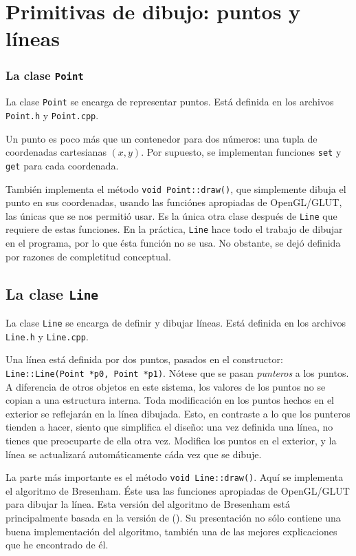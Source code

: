 \section{Primitivas de dibujo: puntos y líneas}
\label{primitivas_dibujo}

\subsubsection{La clase \lstinline!Point!}

La clase \lstinline!Point! se encarga de representar puntos. Está definida en
los archivos \lstinline!Point.h! y \lstinline!Point.cpp!.

Un punto es poco más que un contenedor para dos números: una tupla de coordenadas
cartesianas $(x, y)$. Por supuesto, se implementan funciones \lstinline!set! y
\lstinline!get! para cada coordenada.

También implementa el método \lstinline!void Point::draw()!, que simplemente dibuja
el punto en sus coordenadas, usando las funciónes apropiadas de OpenGL/GLUT, las
únicas que se nos permitió usar. Es la única
otra clase después de \lstinline!Line! que requiere de estas funciones. En la práctica,
\lstinline!Line! hace todo el trabajo de dibujar en el programa, por lo que ésta
función no se usa. No obstante, se dejó definida por razones de completitud conceptual.

\subsection{La clase \lstinline!Line!}

La clase \lstinline!Line! se encarga de definir y dibujar líneas. Está definida en
los archivos \lstinline!Line.h! y \lstinline!Line.cpp!.

Una línea está definida por dos puntos, pasados en el constructor: \lstinline!Line::Line(Point *p0, Point *p1)!.
Nótese que se pasan \emph{punteros} a los puntos. A diferencia de otros objetos en este
sistema, los valores de los puntos no se copian a una estructura interna. Toda modificación
en los puntos hechos en el exterior se reflejarán en la línea dibujada. Esto, en contraste
a lo que los punteros tienden a hacer, siento que simplifica el diseño: una vez
definida una línea, no tienes que preocuparte de ella otra vez. Modifica los puntos en
el exterior, y la línea se actualizará automáticamente cáda vez que se dibuje.

La parte más importante es el método \lstinline!void Line::draw()!. Aquí se implementa el
algoritmo de Bresenham. Éste usa las funciones apropiadas de OpenGL/GLUT para dibujar
la línea. Esta versión del algoritmo de Bresenham está principalmente basada en
la versión de \citeauthor{bresenham} (\citeyear{bresenham}). Su presentación no sólo
contiene una buena implementación del algoritmo, también una de las mejores explicaciones
que he encontrado de él.
